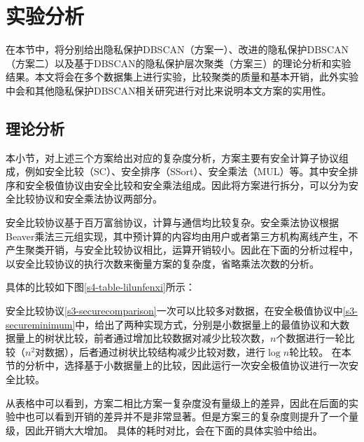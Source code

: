 \section{实验分析}
\label{s4-shiyan}
在本节中，将分别给出隐私保护DBSCAN（方案一）、改进的隐私保护DBSCAN（方案二）以及基于DBSCAN的隐私保护层次聚类（方案三）的理论分析和实验结果。本文将会在多个数据集上进行实验，比较聚类的质量和基本开销，此外实验中会和其他隐私保护DBSCAN相关研究进行对比来说明本文方案的实用性。

\subsection{理论分析}
本小节，对上述三个方案给出对应的复杂度分析，方案主要有安全计算子协议组成，例如安全比较（SC）、安全排序（SSort）、安全乘法（MUL）等。其中安全排序和安全极值协议由安全比较和安全乘法组成。因此将方案进行拆分，可以分为安全比较协议和安全乘法协议两部分。

安全比较协议基于百万富翁协议\cite{rathee2020cryptflow2}，计算与通信均比较复杂。安全乘法协议根据Beaver乘法三元组\cite{beaver1992efficient}实现，其中预计算的内容均由用户或者第三方机构离线产生，不产生聚类开销，与安全比较协议相比，运算开销较小。因此在下面的分析过程中，以安全比较协议的执行次数来衡量方案的复杂度，省略乘法次数的分析。

具体的比较如下图\ref{s4-table-lilunfenxi}所示：

\begin{table}[htbp]
	\centering
	\renewcommand{\arraystretch}{1.3}
	\caption{方案复杂度理论分析}
	\label{s4-table-lilunfenxi}
\end{table}

安全比较协议\ref{s3-securecomparison}一次可以比较多对数据，在安全极值协议中\ref{s3-secureminimum}中，给出了两种实现方式，分别是小数据量上的最值协议和大数据量上的树状比较，前者通过增加比较数据对减少比较次数，$ n $个数据进行一轮比较（$ n^2 $对数据），后者通过树状比较结构减少比较对数，进行$ \log n $轮比较。
在本节的分析中，选择基于小数据量上的比较，因此运行一次安全极值协议进行一次安全比较。

从表格中可以看到，方案二相比方案一复杂度没有量级上的差异，因此在后面的实验中也可以看到开销的差异并不是非常显著。但是方案三的复杂度则提升了一个量级，因此开销大大增加。
具体的耗时对比，会在下面的具体实验中给出。
